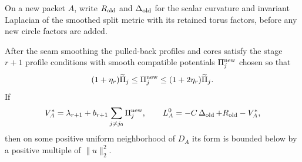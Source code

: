 On a new packet $A$, write $R_{\rm old}$ and $\operatorname{\Delta}_{\rm old}$ for the
scalar curvature and invariant Laplacian of the smoothed split metric
with its retained torus factors, before any new circle factors are added.

\begin{lemma}\label{regular:profiles}
After the seam smoothing the pulled-back profiles and cores satisfy
the stage $r+1$ profile conditions with smooth compatible potentials
$\Pi_j^{\rm new}$ chosen so that
\[
 (1+\eta_r)\widetilde\Pi_j
 \le\Pi_j^{\rm new}\le(1+2\eta_r)\widetilde\Pi_j.
\]
If
\begin{equation}\label{regular:Vstar}
 V_A^*=\lambda_{r+1}+b_{r+1}\sum_{j\ne j_0}\Pi_j^{\rm new},\qquad
 L_A^0=-C\operatorname{\Delta}_{\rm old}+R_{\rm old}-V_A^*,
\end{equation}
then on some positive uniform neighborhood of $D_A$ its form is bounded
below by a positive multiple of $\|u\|_2^2$.
\end{lemma}

